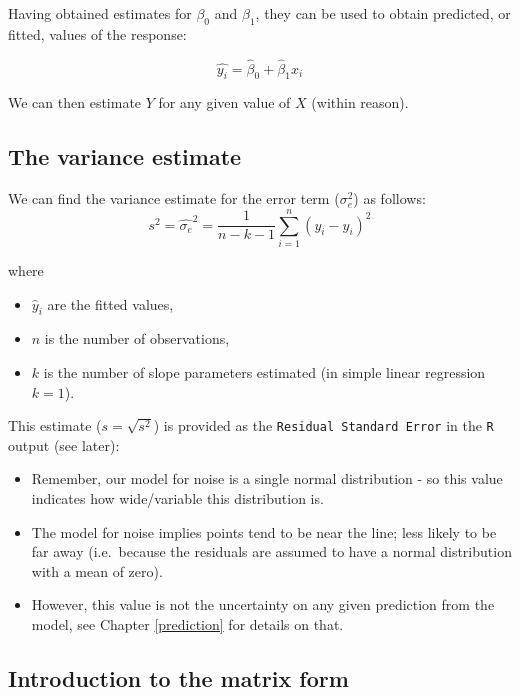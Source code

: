 \documentclass[
  oneside]{krantz}
\providecommand{\tightlist}{%
  \setlength{\itemsep}{0pt}\setlength{\parskip}{0pt}}
\begin{document}
Having obtained estimates for \(\beta_0\) and \(\beta_1\), they can be used to obtain predicted, or fitted, values of the response:

\[\hat{y_i}=\hat{\beta}_0+\hat{\beta}_1x_{i}\]

We can then estimate \(Y\) for any given value of \(X\) (within reason).

\hypertarget{the-variance-estimate}{%
\subsection{The variance estimate}\label{the-variance-estimate}}

We can find the variance estimate for the error term (\(\sigma_e^2\)) as follows:
\begin{equation}
s^2 = \hat{\sigma_e}^2=\frac{1}{n-k-1}\sum_{i=1}^n(y_i-\hat{y}_i)^2
\end{equation}

where

\begin{itemize}
\tightlist
\item
  \(\hat{y}_i\) are the fitted values,
\item
  \(n\) is the number of observations,
\item
  \(k\) is the number of slope parameters estimated (in simple linear regression \(k=1\)).
\end{itemize}

This estimate (\(s=\sqrt{s^2}\)) is provided as the \texttt{Residual\ Standard\ Error} in the \texttt{R} output (see later):

\begin{itemize}
\tightlist
\item
  Remember, our model for noise is a single normal distribution - so this value indicates how wide/variable this distribution is.
\item
  The model for noise implies points tend to be near the line; less likely to be far away (i.e.~because the residuals are assumed to have a normal distribution with a mean of zero).
\item
  However, this value is not the uncertainty on any given prediction from the model, see Chapter \ref{prediction} for details on that.
\end{itemize}

\hypertarget{introduction-to-the-matrix-form}{%
\subsection{Introduction to the matrix form}\label{introduction-to-the-matrix-form}}
\end{document}
